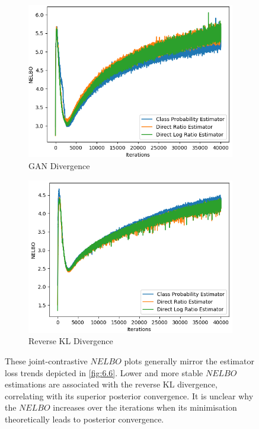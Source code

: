 \documentclass[honours,12pt]{unswthesis}
\numberwithin{equation}{section}
\theoremstyle{definition}
\begin{document}
\begin{figure}
\begin{subfigure}{0.49\textwidth}
\includegraphics[width=\linewidth]{nelbos/JCADVvsJCADVexpvsJCADVgudlog.png}
\caption{GAN Divergence}
\end{subfigure}
\begin{subfigure}{0.49\textwidth}
\includegraphics[width=\linewidth]{nelbos/JCKLDvsJCKLexpvsJCKLgudlog.png}
\caption{Reverse KL Divergence}
\end{subfigure}
\caption{\small These joint-contrastive $NELBO$ plots generally mirror the estimator loss trends depicted in \autoref{fig:6.6}. Lower and more stable $NELBO$ estimations are associated with the reverse KL divergence, correlating with its superior posterior convergence. It is unclear why the $NELBO$ increases over the iterations when its minimisation theoretically leads to posterior convergence.}
\label{fig:6.7}
\end{figure}
\end{document}
